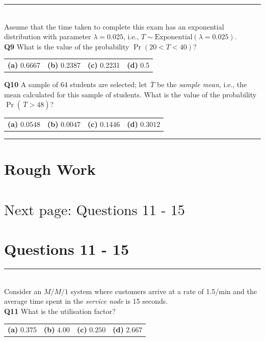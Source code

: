 \documentclass[12pt]{article}
\begin{document}
\rule{\linewidth}{1pt}
\quad\\
Assume that the time taken to complete this exam has an exponential distribution with parameter $\lambda = 0.025$, i.e., $T \sim \text{Exponential}(\lambda=0.025)$.\\[0.3cm]
{\bf Q9} What is the value of the probability $\Pr(20 < T < 40)$? \\[0.2cm]
\begin{tabular}{cccc}
{\bf(a)} 0.6667 & {\bf(b)} 0.2387 & {\bf(c)} 0.2231 & {\bf(d)} 0.5\\[0.6cm]
\end{tabular}

{\bf Q10} A sample of 64 students are selected; let $\,\overline{\!T}$ be the \emph{sample mean}, i.e., the mean calculated for this sample of students. What is the value of the probability $\Pr(\,\overline{\!T} > 48)$? \\[0.2cm]
\begin{tabular}{cccc}
{\bf(a)} $0.0548$ & {\bf(b)} $ 0.0047$ & {\bf(c)} $0.1446$  & {\bf(d)} $0.3012$ \\[0.6cm]
\end{tabular}


\rule{\linewidth}{1pt}

\newpage

\section*{Rough Work\\[23cm]}
\section*{\hspace{8cm}$\boxed{\text{Next page: Questions 11 - 15}}$}

\newpage

\section*{Questions 11 - 15}

\rule{\linewidth}{1pt}
\quad\\
Consider an $M/M/1$ system where customers arrive at a rate of 1.5/min and the average time spent in the \emph{service node} is 15 seconds.\\[0.2cm]

{\bf Q11} What is the utilisation factor?\\[0.2cm]
\begin{tabular}{cccc}
{\bf(a)} $0.375$ & {\bf(b)} $4.00$ & {\bf(c)} $0.250$ & {\bf(d)} $2.667$ \\[0.6cm]
\end{tabular}
\end{document}
